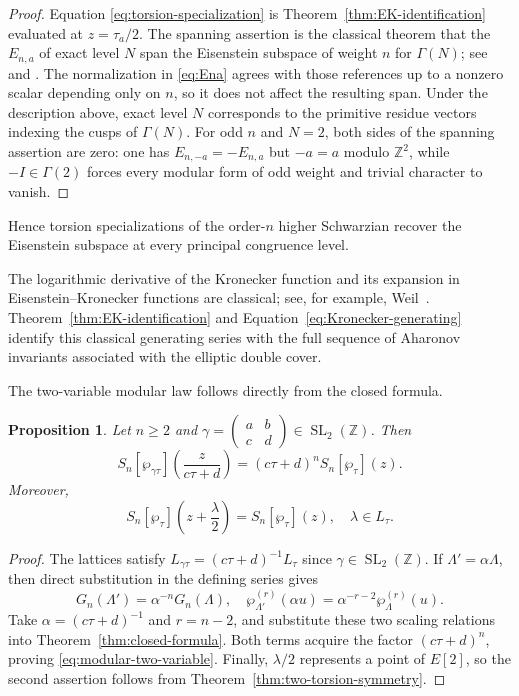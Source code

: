 \documentclass[11pt]{amsart}
\newtheorem{prop}[thm]{Proposition}
\theoremstyle{definition}
\theoremstyle{remark}
\numberwithin{equation}{section}
\begin{document}
\begin{proof}
Equation \eqref{eq:torsion-specialization} is Theorem~\ref{thm:EK-identification} evaluated at $z=\tau_a/2$. The spanning assertion is the classical theorem that the $E_{n,a}$ of exact level $N$ span the Eisenstein subspace of weight $n$ for $\Gamma(N)$; see \cite{schoeneberg} and \cite[Theorem~2.1]{pasol}.
The normalization in \eqref{eq:Ena} agrees with those references up to a
nonzero scalar depending only on $n$, so it does not affect the resulting span. Under the description above, exact level $N$ corresponds to the primitive residue vectors indexing the cusps of $\Gamma(N)$. For odd $n$ and $N=2$, both sides of the
spanning assertion are zero: one has $E_{n,-a}=-E_{n,a}$ but $-a=a$ modulo
$\mathbb Z^2$, while $-I\in\Gamma(2)$ forces every modular form of odd weight
and trivial character to vanish.
\end{proof}

Hence torsion specializations of the order-\(n\) higher Schwarzian recover the Eisenstein subspace at every principal congruence level.


The logarithmic derivative of the Kronecker function and its expansion in
Eisenstein--Kronecker functions are classical; see, for example,
Weil~\cite{weil}. Theorem~\ref{thm:EK-identification} and
Equation~\eqref{eq:Kronecker-generating} identify this classical generating
series with the full sequence of Aharonov invariants associated with the
elliptic double cover.



The two-variable modular law follows directly from the closed formula.

\begin{prop}\label{prop:modular-two-variable}
Let $n\geq2$ and $\gamma=\left(\begin{smallmatrix}a&b\\c&d\end{smallmatrix}\right)\in\operatorname{SL}_2(\mathbb Z)$. Then
\begin{equation}\label{eq:modular-two-variable}
S_n[\wp_{\gamma\tau}]\left(\frac{z}{c\tau+d}\right)
=
(c\tau+d)^nS_n[\wp_\tau](z).
\end{equation}
Moreover,
\[
S_n[\wp_\tau]\left(z+\frac{\lambda}{2}\right)
=S_n[\wp_\tau](z),
\quad \lambda\in L_\tau.
\]
\end{prop}

\begin{proof}
The lattices satisfy $L_{\gamma\tau}=(c\tau+d)^{-1}L_\tau$ since $\gamma\in \operatorname{SL}_2(\mathbb Z) $. If
$\Lambda'=\alpha\Lambda$, then direct substitution in the defining series
gives
\[
G_n(\Lambda')=\alpha^{-n}G_n(\Lambda),\quad
\wp_{\Lambda'}^{(r)}(\alpha u)=\alpha^{-r-2}\wp_\Lambda^{(r)}(u).
\]
Take $\alpha=(c\tau+d)^{-1}$ and $r=n-2$, and substitute these two scaling
relations into Theorem~\ref{thm:closed-formula}. Both terms acquire the factor
$(c\tau+d)^n$, proving \eqref{eq:modular-two-variable}. Finally,
$\lambda/2$ represents a point of $E[2]$, so the second assertion follows from
Theorem~\ref{thm:two-torsion-symmetry}.
\end{proof}
\end{document}
